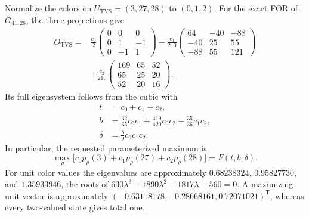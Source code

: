 \documentclass[aps,pra,reprint,superscriptaddress,longbibliography,nofootinbib,floatfix,10pt]{revtex4-2}
\theoremstyle{definition}\newtheorem{definition}[theorem]{Definition}
\theoremstyle{remark}\newtheorem{remark}[theorem]{Remark}
\begin{document}
Normalize the colors on $U_{\mathrm{TVS}}=(3,27,28)$ to $(0,1,2)$. For the exact FOR of $G_{41,26}$, the three projections give
\begin{equation}\label{eq:weighted-roof-operator}
\begin{aligned}
O_{\mathrm{TVS}}={}&\frac{c_0}{2}\begin{pmatrix}0&0&0\\0&1&-1\\0&-1&1\end{pmatrix}
+\frac{c_1}{210}\begin{pmatrix}64&-40&-88\\-40&25&55\\-88&55&121\end{pmatrix}\\
&+\frac{c_2}{210}\begin{pmatrix}169&65&52\\65&25&20\\52&20&16\end{pmatrix}.
\end{aligned}
\end{equation}
Its full eigensystem follows from the cubic with
\begin{equation}\label{eq:weighted-roof-coefficients}
\begin{aligned}
t&=c_0+c_1+c_2,\\
b&=\tfrac{32}{35}c_0c_1+\tfrac{419}{420}c_0c_2+\tfrac{35}{36}c_1c_2,\\
\delta&=\tfrac89c_0c_1c_2.
\end{aligned}
\end{equation}
In particular, the requested parameterized maximum is
\begin{equation}\label{eq:weighted-roof-max}
\max_\rho\bigl[c_0p_\rho(3)+c_1p_\rho(27)+c_2p_\rho(28)\bigr]
=F(t,b,\delta).
\end{equation}
For unit color values the eigenvalues are approximately $0.68238324$, $0.95827730$, and $1.35933946$, the roots of $630\lambda^3-1890\lambda^2+1817\lambda-560=0$. A maximizing unit vector is approximately $(-0.63118178,-0.28668161,0.72071021)^{\mathsf T}$, whereas every two-valued state gives total one.
\end{document}
